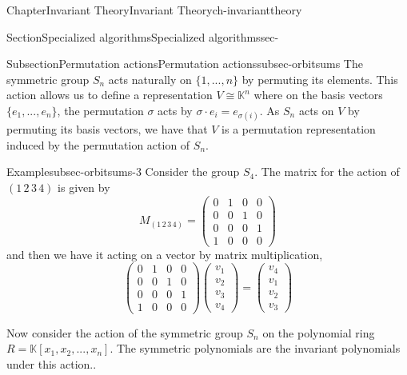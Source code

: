 \documentclass[oneside,10pt,]{book}
\newcommand{\amp}{&}
\begin{document}
\begin{chapterptx}{Chapter}{Invariant Theory}{}{Invariant Theory}{}{}{ch-invarianttheory}
\begin{sectionptx}{Section}{Specialized algorithms}{}{Specialized algorithms}{}{}{sec-}
%
%
\typeout{************************************************}
\typeout{************************************************}
%
\begin{subsectionptx}{Subsection}{Permutation actions}{}{Permutation actions}{}{}{subsec-orbitsums}
The symmetric group \(S_n \) acts naturally on \(\{1, ... , n\}\) by permuting its elements. This action allows us to define a representation \(V \cong \mathbb{K}^n\) where on the basis vectors \(\{e_1, ... , e_n\}\), the permutation \(\sigma\) acts by \(\sigma \cdot e_i = e_{\sigma(i)}\). As \(S_n \) acts on \(V\) by permuting its basis vectors, we have that \(V\) is a permutation representation induced by the permutation action of \(S_n\).%
\begin{example}{Example}{}{subsec-orbitsums-3}%
Consider the group \(S_4\). The matrix for the action of \((1 \,2\,3\,4) \) is given by%
\begin{equation*}
M_{(1 \,2\,3\,4)} =  \begin{pmatrix}
0 \amp 1 \amp 0 \amp 0 \\
0 \amp 0 \amp 1 \amp 0 \\
0 \amp 0 \amp 0 \amp 1 \\
1 \amp 0 \amp 0 \amp 0 
\end{pmatrix}   
\end{equation*}
and then we have it acting on a vector by matrix multiplication,%
\begin{equation*}
\begin{pmatrix}
0 \amp 1 \amp 0 \amp 0 \\
0 \amp 0 \amp 1 \amp 0 \\
0 \amp 0 \amp 0 \amp 1 \\
1 \amp 0 \amp 0 \amp 0 
\end{pmatrix} \begin{pmatrix}
v_1 \\
v_2 \\
v_3\\
v_4
\end{pmatrix}   =    \begin{pmatrix}
v_4 \\
v_1 \\
v_2\\
v_3
\end{pmatrix}
\end{equation*}
%
\end{example}
Now consider the action of the symmetric group \(S_n\) on the polynomial ring \(R=\mathbb{K}[x_1,x_2,...,x_n]\). The symmetric polynomials are the invariant polynomials under this action..%

\end{subsectionptx}
\end{sectionptx}
\end{chapterptx}
\end{document}
